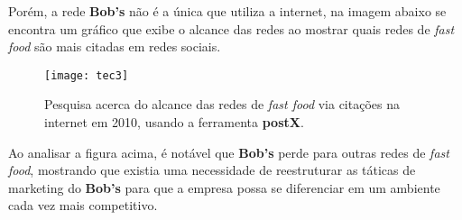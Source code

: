 			Porém, a rede \textbf{Bob’s} não é a única que utiliza a internet, na imagem abaixo se encontra um gráfico que exibe o alcance das redes ao mostrar quais redes de \emph{fast food} são mais citadas em redes sociais. \cite{miti}

			\begin{figure}[h]
				\centering
				\texttt{[image: tec3]}
				\caption[Pesquisa acerca do alcance das redes de fast food via citações na internet em 2010, usando a ferramenta postX]{Pesquisa acerca do alcance das redes de \emph{fast food} via citações na internet em 2010, usando a ferramenta \textbf{postX}. \cite{miti}}
				\label{fig:tec3}
			\end{figure}

			Ao analisar a figura acima, é notável que \textbf{Bob’s} perde para outras redes de \emph{fast food}, mostrando que existia uma necessidade de reestruturar as táticas de marketing do \textbf{Bob’s} para que a empresa possa se diferenciar em um ambiente cada vez mais competitivo. 

		